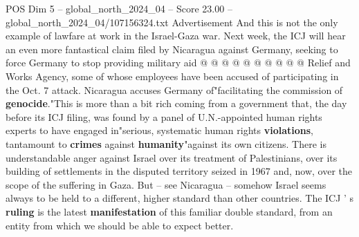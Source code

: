 \begin{textsample}{POS Dim 5 – global\_north\_2024\_04 – Score 23.00 – global\_north\_2024\_04/107156324.txt}
Advertisement And this is not the only example of lawfare at work in the Israel-Gaza war.
Next week, the ICJ will hear an even more fantastical claim filed by Nicaragua against Germany, seeking to force Germany to stop providing military aid @ @ @ @ @ @ @ @ @ @ Relief and Works Agency, some of whose employees have been accused of participating in the Oct. 7 attack.
Nicaragua accuses Germany of"facilitating the commission of \textbf{genocide}."This is more than a bit rich coming from a government that, the day before its ICJ filing, was found by a panel of U.N.-appointed human rights experts to have engaged in"serious, systematic human rights \textbf{violations}, tantamount to \textbf{crimes} against \textbf{humanity}"against its own citizens.
There is understandable anger against Israel over its treatment of Palestinians, over its building of settlements in the disputed territory seized in 1967 and, now, over the scope of the suffering in Gaza.
But -- see Nicaragua -- somehow Israel seems always to be held to a different, higher standard than other countries.
The ICJ ' s \textbf{ruling} is the latest \textbf{manifestation} of this familiar double standard, from an entity from which we should be able to expect better.

\end{textsample}
